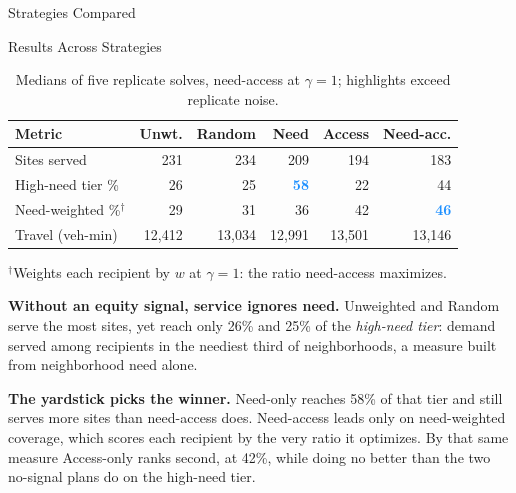 \documentclass[final]{beamer}
\newlength{\colwidth}
\begin{document}
\begin{frame}[t]
\begin{columns}[t]
\begin{column}{\colwidth}
\begin{block}{Strategies Compared}
  \end{block}

\vspace{0.2em}

  \begin{block}{Results Across Strategies}

    \begin{table}
      \vspace{-0.4em}
      \centering
      \normalsize
      \captionsetup{justification=centering, singlelinecheck=true}
      \caption{Medians of five replicate solves, need-access at $\gamma = 1$;
      highlights exceed replicate noise.}
      \begin{tabular*}{\linewidth}{@{\extracolsep{\fill}}lrrrrr@{}}
        \toprule
        \textbf{Metric} & \textbf{Unwt.} & \textbf{Random} & \textbf{Need}
          & \textbf{Access} & \textbf{Need-acc.} \\
        \midrule
        Sites served
          & 231 & 234 & 209 & 194 & 183 \\
        High-need tier \%
          & 26 & 25 & \textcolor{DodgerBlue}{\textbf{58}} & 22 & 44 \\
        Need-weighted \%$^\dagger$
          & 29 & 31 & 36 & 42 & \textcolor{DodgerBlue}{\textbf{46}} \\
        Travel (veh-min)
          & 12,412 & 13,034 & 12,991 & 13,501 & 13,146 \\
        \bottomrule
      \end{tabular*}

      \vspace{0.3em}
      {\small $^\dagger$Weights each recipient by $w$ at $\gamma = 1$: the ratio
      need-access maximizes.}
    \end{table}

    \textbf{Without an equity signal, service ignores need.} Unweighted and Random
    serve the most sites, yet reach only 26\% and 25\% of the \emph{high-need
    tier}: demand served among recipients in the neediest third of
    neighborhoods, a measure built from neighborhood need alone.

    \textbf{The yardstick picks the winner.} Need-only reaches 58\% of that tier
    and still serves more sites than need-access does. Need-access leads only on
    need-weighted coverage, which scores each recipient by the very ratio it
    optimizes. By that same measure Access-only ranks second, at 42\%, while doing
    no better than the two no-signal plans do on the high-need tier.


\end{block}
\end{column}
\end{columns}
\end{frame}
\end{document}
